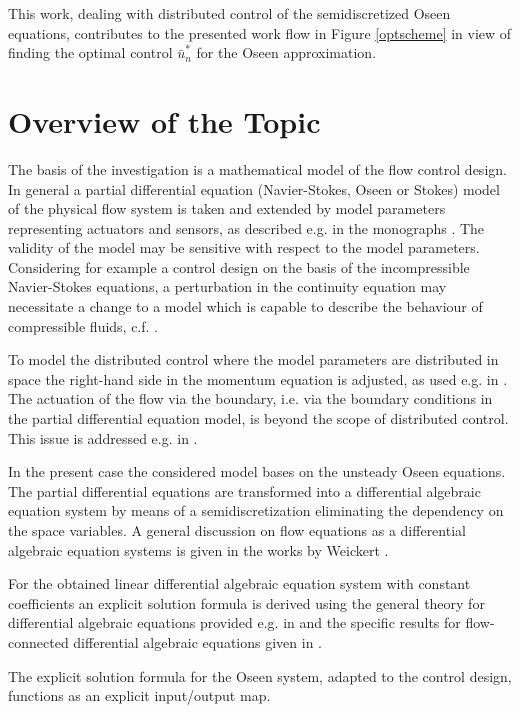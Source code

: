 \documentclass[a4paper,10pt,BCOR=15mm]{scrbook}
\begin{document}
This work, dealing with distributed control of the semidiscretized Oseen equations, contributes to the presented work flow in Figure \ref{optscheme} in view of finding the optimal control $\bar u_{n}^*$ for the Oseen approximation. 

\section{Overview of the Topic}
The basis of the investigation is a mathematical model of the flow control design. In general a partial differential equation (Navier-Stokes, Oseen or Stokes) model of the physical flow system is taken and extended by model parameters representing actuators and sensors, as described e.g. in the monographs \cite{bens1,bens2}. The validity of the model may be sensitive with respect to the model parameters. Considering for example a control design on the basis of the incompressible Navier-Stokes equations, a perturbation in the continuity equation may necessitate a change to a model which is capable to describe the behaviour of compressible fluids, c.f. \cite{feirei}.

To model the distributed control where the model parameters are distributed in space the right-hand side in the momentum equation is adjusted, as used e.g. in \cite{betezi,dehi,guhosv,guma,hesosu,hinz}. The actuation of the flow via the boundary, i.e. via the boundary conditions in the partial differential equation model, is beyond the scope of distributed control. This issue is addressed e.g. in \cite{guma2,hiku,hosv}.

In the present case the considered model bases on the unsteady Oseen equations. The partial differential equations are transformed into a differential algebraic equation system by means of a semidiscretization eliminating the dependency on the space variables. A general discussion on flow equations as a differential algebraic equation systems is given in the works by Weickert \cite{weic,weic2}. 

For the obtained linear differential algebraic equation system with constant coefficients an explicit solution formula is derived using the general theory for differential algebraic equations provided e.g. in \cite{mehr} and the specific results for flow-connected differential algebraic equations given in \cite{emme}.

The explicit solution formula for the Oseen system, adapted to the control design, functions as an explicit input/output map.
\end{document}
